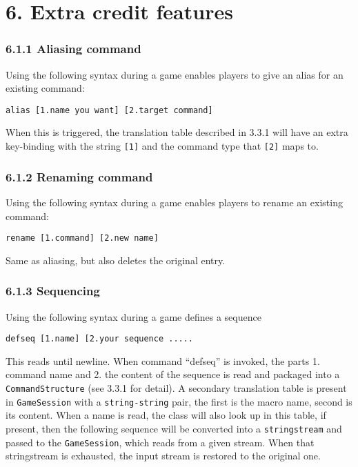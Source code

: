 \documentclass[
]{article}
\begin{document}
\hypertarget{extra-credit-features}{%
\section{6. Extra credit features}\label{extra-credit-features}}

\hypertarget{aliasing-command}{%
\subsubsection{6.1.1 Aliasing command}\label{aliasing-command}}

Using the following syntax during a game enables players to give an
alias for an existing command:

\begin{verbatim}
alias [1.name you want] [2.target command]
\end{verbatim}

When this is triggered, the translation table described in 3.3.1 will
have an extra key-binding with the string \texttt{{[}1{]}} and the
command type that \texttt{{[}2{]}} maps to.

\hypertarget{renaming-command}{%
\subsubsection{6.1.2 Renaming command}\label{renaming-command}}

Using the following syntax during a game enables players to rename an
existing command:

\begin{verbatim}
rename [1.command] [2.new name]
\end{verbatim}

Same as aliasing, but also deletes the original entry.

\hypertarget{sequencing}{%
\subsubsection{6.1.3 Sequencing}\label{sequencing}}

Using the following syntax during a game defines a sequence

\begin{verbatim}
defseq [1.name] [2.your sequence .....
\end{verbatim}

This reads until newline. When command ``defseq'' is invoked, the parts
1. command name and 2. the content of the sequence is read and packaged
into a \texttt{CommandStructure} (see 3.3.1 for detail). A secondary
translation table is present in \texttt{GameSession} with a
\texttt{string-string} pair, the first is the macro name, second is its
content. When a name is read, the class will also look up in this table,
if present, then the following sequence will be converted into a
\texttt{stringstream} and passed to the \texttt{GameSession}, which
reads from a given stream. When that stringstream is exhausted, the
input stream is restored to the original one.
\end{document}

